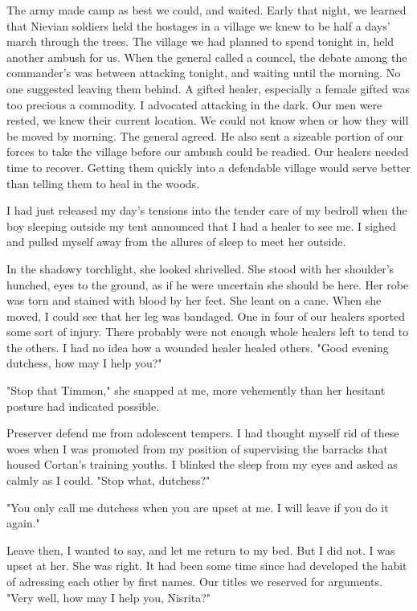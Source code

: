 \documentclass{article}
\begin{document}
The army made camp as best we could, and waited. Early that night, we learned that Nievian soldiers held the hostages in a village we knew to be half a days' march through the trees. The village we had planned to spend tonight in, held another ambush for us. When the general called a councel, the debate among the commander's was between attacking tonight, and waiting until the morning. No one suggested leaving them behind. A gifted healer, especially a female gifted was too precious a commodity. I advocated attacking in the dark. Our men were rested, we knew their current location. We could not know when or how they will be moved by morning. The general agreed. He also sent a sizeable portion of our forces to take the village before our ambush could be readied. Our healers needed time to recover. Getting them quickly into a defendable village would serve better than telling them to heal in the woods.

I had just released my day's tensions into the tender care of my bedroll when the boy sleeping outside my tent announced that I had a healer to see me. I sighed and pulled myself away from the allures of sleep to meet her outside. 

In the shadowy torchlight, she looked shrivelled. She stood with her shoulder's hunched, eyes to the ground, as if he were uncertain she should be here. Her robe was torn and stained with blood by her feet. She leant on a cane. When she moved, I could see that her leg was bandaged. One in four of our healers sported some sort of injury. There probably were not enough whole healers left to tend to the others. I had no idea how a wounded healer healed others. "Good evening dutchess, how may I help you?"

"Stop that Timmon," she snapped at me, more vehemently than her hesitant posture had indicated possible.

Preserver defend me from adolescent tempers. I had thought myself rid of these woes when I was promoted from my position of supervising the barracks that housed Cortan's training youths. I blinked the sleep from my eyes and asked as calmly as I could. "Stop what, dutchess?"

"You only call me dutchess when you are upset at me. I will leave if you do it again."

Leave then, I wanted to say, and let me return to my bed. But I did not. I was upset at her. She was right. It had been some time since had developed the habit of adressing each other by first names. Our titles we reserved for arguments. "Very well, how may I help you, Nisrita?"
\end{document}
